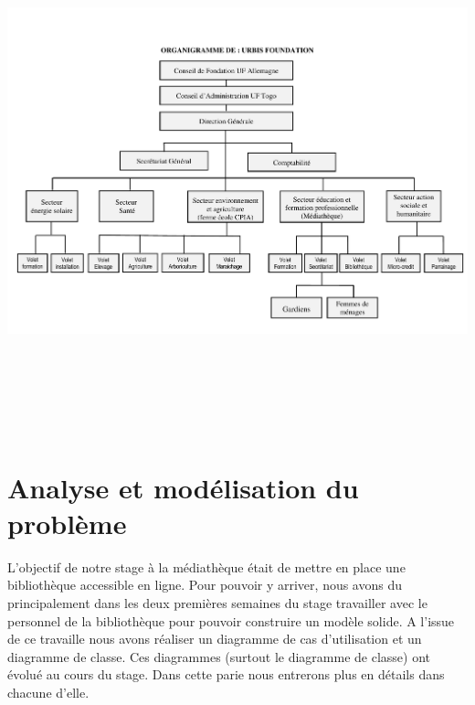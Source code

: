\documentclass[12pt,a4paper]{article}
\begin{document}
\includegraphics[width=16cm,height=15cm]{./images/ORGANIGRAMME.pdf} 
\newpage
\section{Analyse et modélisation du problème}
L'objectif de notre stage à la médiathèque était de mettre en place une bibliothèque accessible en ligne. Pour pouvoir y arriver, nous avons du principalement dans les deux premières semaines du stage travailler avec le personnel de la bibliothèque pour pouvoir construire un modèle solide. A l'issue 
de ce travaille nous avons réaliser un diagramme de cas d'utilisation et un 
diagramme de classe. Ces diagrammes (surtout le diagramme de classe) ont évolué
au cours du stage. Dans cette parie nous entrerons plus en détails dans chacune 
d'elle.
\end{document}
